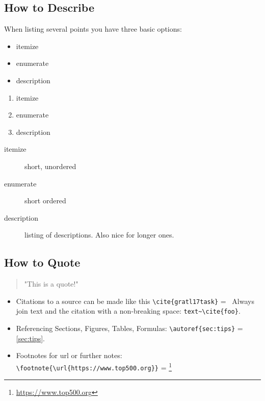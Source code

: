 \documentclass[
			   fontsize=11pt,
               paper=a4,
               bibliography=totoc,
               idxtotoc,
               headsepline,
               footsepline,
               footinclude=false,
               BCOR=12mm,
               DIV=13,
               openany,   %
               ]
               {scrbook}
\begin{document}
\subsection{How to Describe}
\setlength{\columnsep}{30 pt}
When listing several points you have three basic options:
\begin{multicols}{3}
	\begin{itemize}
		\item itemize
		\item enumerate
		\item description
	\end{itemize}
	
	\vfill\null
	\columnbreak
	
	\begin{enumerate}
		\item itemize
		\item enumerate
		\item description
	\end{enumerate}
	
	\vfill\null
	\columnbreak
	
	\begin{description}
		\item[itemize] short, unordered
		\item[enumerate] short ordered
		\item[description] listing of descriptions. Also nice for longer ones.
	\end{description}
	
\end{multicols}


\subsection{How to Quote}

\begin{quote}
	"This is a quote!"
\end{quote}

\begin{itemize}
	\item Citations to a source can be made like this \verb|\cite{gratl17task}| =~\cite{gratl17task}
	\subitem Always join text and the citation with a non-breaking space: \verb|text~\cite{foo}|.
	\item Referencing Sections, Figures, Tables, Formulas: \verb|\autoref{sec:tips}| = \autoref{sec:tips}.
	\item Footnotes for url or further notes: \verb|\footnote{\url{https://www.top500.org}}| = \footnote{\url{https://www.top500.org}}
\end{itemize}
\end{document}
